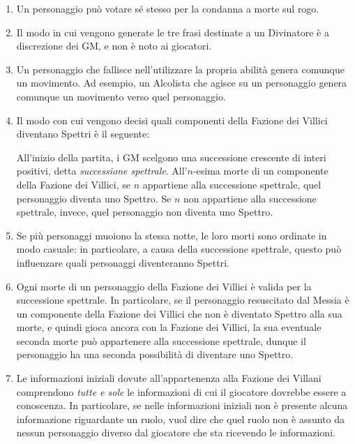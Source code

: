 \documentclass[a4paper,10pt]{article}
\begin{document}
\begin{enumerate}
	\item Un personaggio può votare sé stesso per la condanna a morte sul rogo.

	\item Il modo in cui vengono generate le tre frasi destinate a un Divinatore è a discrezione dei GM, e non è noto ai giocatori.

	\item Un personaggio che fallisce nell'utilizzare la propria abilità genera comunque un movimento.
	      Ad esempio, un Alcolista che agisce su un personaggio genera comunque un movimento verso quel personaggio.

	\item Il modo con cui vengono decisi quali componenti della Fazione dei Villici diventano Spettri è il seguente:

	      All'inizio della partita, i GM scelgono una successione crescente di interi positivi, detta \emph{successione spettrale}. All'$n$-esima morte di un componente della Fazione dei Villici, se $n$ appartiene alla successione spettrale, quel personaggio diventa uno Spettro. Se $n$ non appartiene alla successione spettrale, invece, quel personaggio non diventa uno Spettro.

	\item Se più personaggi muoiono la stessa notte, le loro morti sono ordinate in modo casuale: in particolare, a causa della successione spettrale, questo può influenzare quali personaggi diventeranno Spettri.

	\item Ogni morte di un personaggio della Fazione dei Villici è valida per la successione spettrale. In particolare, se il personaggio resuscitato dal Messia è un componente della Fazione dei Villici che non è diventato Spettro alla sua morte, e quindi gioca ancora con la Fazione dei Villici, la sua eventuale seconda morte può appartenere alla successione spettrale, dunque il personaggio ha una seconda possibilità di diventare uno Spettro.

	\item Le informazioni iniziali dovute all'appartenenza alla Fazione dei Villani comprendono \emph{tutte e sole} le informazioni di cui il giocatore dovrebbe essere a conoscenza. In particolare, se nelle informazioni iniziali non è presente alcuna informazione riguardante un ruolo, vuol dire che quel ruolo non è assunto da nessun personaggio diverso dal giocatore che sta ricevendo le informazioni.


\end{enumerate}
\end{document}
